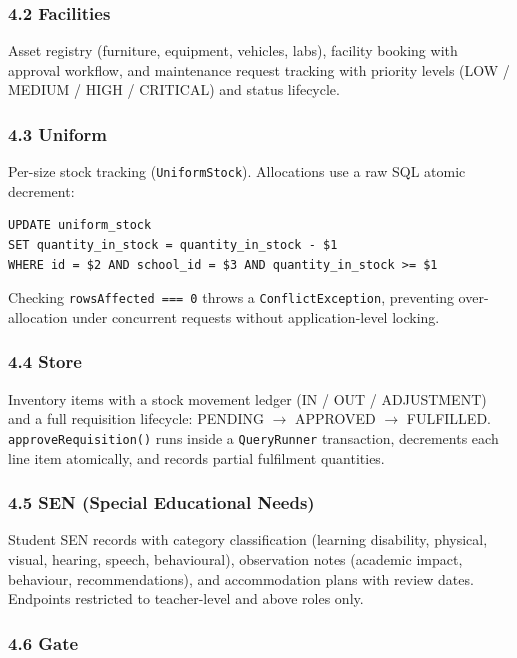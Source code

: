 \documentclass[11pt, a4paper]{article}
\newcommand{\code}[1]{\texttt{\small #1}}
\begin{document}
\subsubsection*{4.2 Facilities}

Asset registry (furniture, equipment, vehicles, labs), facility booking with
approval workflow, and maintenance request tracking with priority levels
(LOW / MEDIUM / HIGH / CRITICAL) and status lifecycle.

\subsubsection*{4.3 Uniform}

Per-size stock tracking (\code{UniformStock}). Allocations use a raw SQL atomic
decrement:

\begin{lstlisting}
UPDATE uniform_stock
SET quantity_in_stock = quantity_in_stock - $1
WHERE id = $2 AND school_id = $3 AND quantity_in_stock >= $1
\end{lstlisting}

Checking \code{rowsAffected === 0} throws a \code{ConflictException},
preventing over-allocation under concurrent requests without application-level
locking.

\subsubsection*{4.4 Store}

Inventory items with a stock movement ledger (IN / OUT / ADJUSTMENT) and a
full requisition lifecycle: PENDING $\to$ APPROVED $\to$ FULFILLED.
\code{approveRequisition()} runs inside a \code{QueryRunner} transaction,
decrements each line item atomically, and records partial fulfilment quantities.

\subsubsection*{4.5 SEN (Special Educational Needs)}

Student SEN records with category classification (learning disability, physical,
visual, hearing, speech, behavioural), observation notes (academic impact,
behaviour, recommendations), and accommodation plans with review dates.
Endpoints restricted to teacher-level and above roles only.

\subsubsection*{4.6 Gate}
\end{document}
